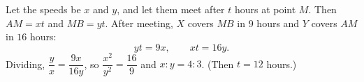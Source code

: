 Let the speeds be $x$ and $y$, and let them meet after $t$ hours at point $M$. Then $AM=xt$ and $MB=yt$. After meeting, $X$ covers $MB$ in $9$ hours and $Y$ covers $AM$ in $16$ hours:
\[
yt=9x,\qquad xt=16y .
\]
Dividing, $\dfrac{y}{x}=\dfrac{9x}{16y}$, so $\dfrac{x^2}{y^2}=\dfrac{16}{9}$ and $x:y=\boxed{4:3}$. (Then $t=12$ hours.)
